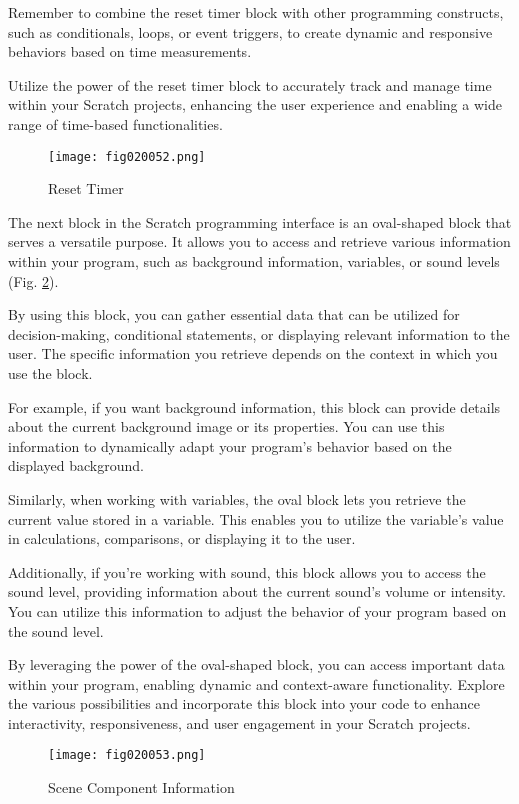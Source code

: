 Remember to combine the reset timer block with other programming constructs, such as conditionals, loops, or event triggers, to create dynamic and responsive behaviors based on time measurements.

Utilize the power of the reset timer block to accurately track and manage time within your Scratch projects, enhancing the user experience and enabling a wide range of time-based functionalities.

\begin{figure}[H]
   \centering
   \texttt{[image: fig020052.png]}
   \caption{Reset Timer}
\label{fig020052}
\end{figure}

The next block in the Scratch programming interface is an oval-shaped block that serves a versatile purpose. It allows you to access and retrieve various information within your program, such as background information, variables, or sound levels (Fig. \ref{fig020053}).

By using this block, you can gather essential data that can be utilized for decision-making, conditional statements, or displaying relevant information to the user. The specific information you retrieve depends on the context in which you use the block.

For example, if you want background information, this block can provide details about the current background image or its properties. You can use this information to dynamically adapt your program's behavior based on the displayed background.

Similarly, when working with variables, the oval block lets you retrieve the current value stored in a variable. This enables you to utilize the variable's value in calculations, comparisons, or displaying it to the user.

Additionally, if you're working with sound, this block allows you to access the sound level, providing information about the current sound's volume or intensity. You can utilize this information to adjust the behavior of your program based on the sound level.

By leveraging the power of the oval-shaped block, you can access important data within your program, enabling dynamic and context-aware functionality. Explore the various possibilities and incorporate this block into your code to enhance interactivity, responsiveness, and user engagement in your Scratch projects.

\begin{figure}[H]
   \centering
   \texttt{[image: fig020053.png]}
   \caption{Scene Component Information}
\label{fig020053}
\end{figure}

